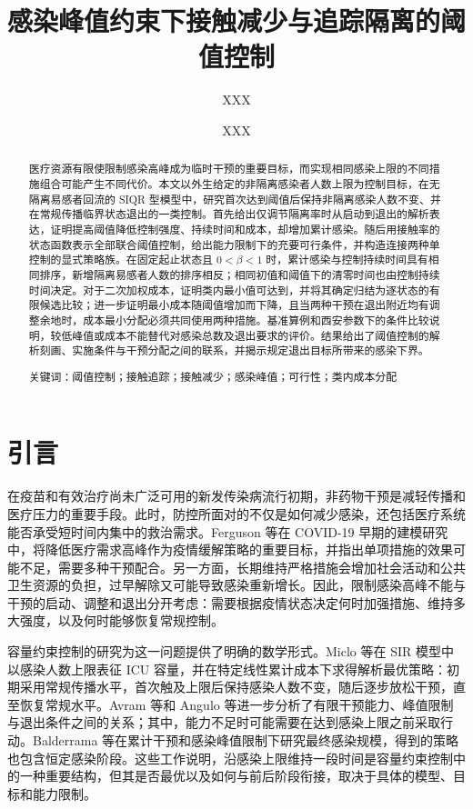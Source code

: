 \documentclass[lang=cn,a4paper,newtx]{elegantpaper}
\title{感染峰值约束下接触减少与追踪隔离的阈值控制}
\author{XXX \and XXX}
\institute{School of Mathematics and Statistics, Shaanxi Normal University}
\date{}
\numberwithin{equation}{section}
\theoremstyle{plain}
\begin{document}
\maketitle
\begin{abstract}
医疗资源有限使限制感染高峰成为临时干预的重要目标，而实现相同感染上限的不同措施组合可能产生不同代价。本文以外生给定的非隔离感染者人数上限为控制目标，在无隔离易感者回流的 SIQR 型模型中，研究首次达到阈值后保持非隔离感染人数不变、并在常规传播临界状态退出的一类控制。首先给出仅调节隔离率时从启动到退出的解析表达，证明提高阈值降低控制强度、持续时间和成本，却增加累计感染。随后用接触率的状态函数表示全部联合阈值控制，给出能力限制下的充要可行条件，并构造连接两种单控制的显式策略族。在固定起止状态且 $0<\beta<1$ 时，累计感染与控制持续时间具有相同排序，新增隔离易感者人数的排序相反；相同初值和阈值下的清零时间也由控制持续时间决定。对于二次加权成本，证明类内最小值可达到，并将其确定归结为逐状态的有限候选比较；进一步证明最小成本随阈值增加而下降，且当两种干预在退出附近均有调整余地时，成本最小分配必须共同使用两种措施。基准算例和西安参数下的条件比较说明，较低峰值或成本不能替代对感染总数及退出要求的评价。结果给出了阈值控制的解析刻画、实施条件与干预分配之间的联系，并揭示规定退出目标所带来的感染下界。
\par\medskip\noindent 关键词：阈值控制；接触追踪；接触减少；感染峰值；可行性；类内成本分配
\end{abstract}

\section{引言}
\label{sec:introduction}
在疫苗和有效治疗尚未广泛可用的新发传染病流行初期，非药物干预是减轻传播和医疗压力的重要手段。此时，防控所面对的不仅是如何减少感染，还包括医疗系统能否承受短时间内集中的救治需求。Ferguson 等\cite{Ferguson2020Report9}在 COVID-19 早期的建模研究中，将降低医疗需求高峰作为疫情缓解策略的重要目标，并指出单项措施的效果可能不足，需要多种干预配合。另一方面，长期维持严格措施会增加社会活动和公共卫生资源的负担，过早解除又可能导致感染重新增长\cite{Duque2020}。因此，限制感染高峰不能与干预的启动、调整和退出分开考虑：需要根据疫情状态决定何时加强措施、维持多大强度，以及何时能够恢复常规控制。

容量约束控制的研究为这一问题提供了明确的数学形式。Miclo 等\cite{Miclo2022ICU}在 SIR 模型中以感染人数上限表征 ICU 容量，并在特定线性累计成本下求得解析最优策略：初期采用常规传播水平，首次触及上限后保持感染人数不变，随后逐步放松干预，直至恢复常规水平。Avram 等\cite{Avram2022}和 Angulo 等\cite{Angulo2021}进一步分析了有限干预能力、峰值限制与退出条件之间的关系；其中，能力不足时可能需要在达到感染上限之前采取行动。Balderrama 等\cite{Balderrama2024}在累计干预和感染峰值限制下研究最终感染规模，得到的策略也包含恒定感染阶段。这些工作说明，沿感染上限维持一段时间是容量约束控制中的一种重要结构，但其是否最优以及如何与前后阶段衔接，取决于具体的模型、目标和能力限制。
\end{document}
